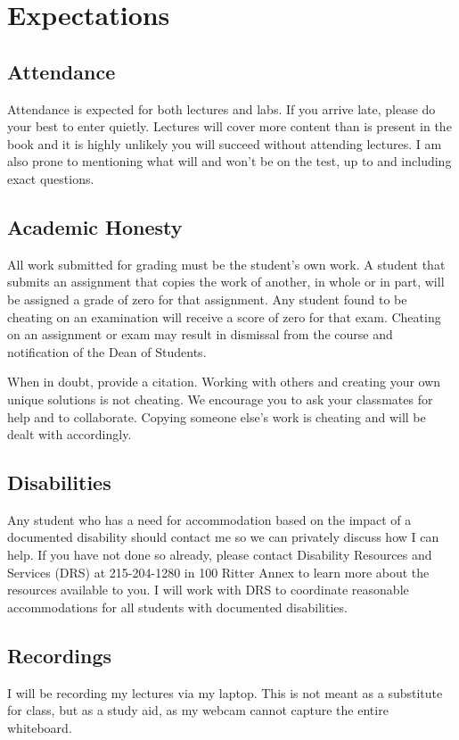 \documentclass[10pt, letter]{article}
\begin{document}
\section{Expectations}

\subsection*{Attendance}
Attendance is expected for both lectures and labs.  
If you arrive late, please do your best to enter quietly.  
Lectures will cover more content than is present in the book and it is highly unlikely you will succeed without attending lectures.
I am also prone to mentioning what will and won't be on the test, up to and including exact questions.



\subsection*{Academic Honesty}
All work submitted for grading must be the student's own work. A student that submits an assignment that copies the work of another, in whole or in part, will be assigned a grade of zero for that assignment. Any student found to be cheating on an examination will receive a score of zero for that exam. Cheating on an assignment or exam may result in dismissal from the course and notification of the Dean of Students.

When in doubt, provide a citation.
Working with others and creating your own unique solutions is not cheating.
We encourage you to ask your classmates for help and to collaborate.
Copying someone else's work is cheating and will be dealt with accordingly.


\subsection*{Disabilities}
Any student who has a need for accommodation based on the impact of a documented disability should contact me so we can privately discuss how I can help. 
If you have not done so already, please contact Disability Resources and Services (DRS) at 215-204-1280 in 100 Ritter Annex to learn more about the resources available to you.
I will work with DRS to coordinate reasonable accommodations for all students with documented disabilities.


\subsection*{Recordings}
I will be recording my lectures via my laptop.
This is not meant as a substitute for class, but as a study aid, as my webcam cannot capture the entire whiteboard.
\end{document}
